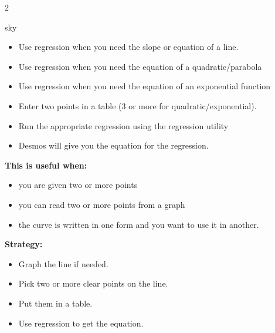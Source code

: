 \documentclass[10pt]{article}
\begin{document}
\begin{multicols}{2}
        \begin{skillbox}{sky}
            \begin{itemize}
                \item {Use regression when you need the slope or equation of a line.}
                \item {Use regression when you need the equation of a quadratic/parabola}
                \item {Use regression when you need the equation of an exponential function}
            \end{itemize}
            \begin{itemize}
                \item Enter two points in a table (3 or more for quadratic/exponential).
                \item Run the appropriate regression using the regression utility
                \item Desmos will give you the equation for the regression.
            \end{itemize}

            \textbf{This is useful when:}
            \begin{itemize}
                \item you are given two or more points
                \item you can read two or more points from a graph
                \item the curve is written in one form and you want to use it in another.
            \end{itemize}

            \textbf{Strategy:}
            \begin{itemize}[noitemsep, topsep=2pt]
                \item Graph the line if needed.
                \item Pick two or more clear points on the line.
                \item Put them in a table.
                \item Use regression to get the equation.
            \end{itemize}
        \end{skillbox}


\end{multicols}
\end{document}
